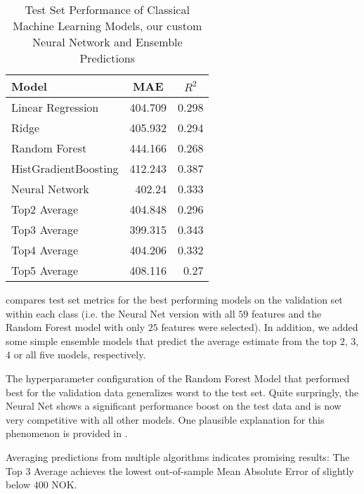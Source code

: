 \begin{table}[th]
  \centering
  \begin{tabular}{lrr}
    \hline
    Model                & \multicolumn{1}{c}{MAE} & \multicolumn{1}{c}{$R^2$} \\ \hline
    Linear Regression    & 404.709                 & 0.298                     \\
    Ridge                & 405.932                 & 0.294                     \\
    Random Forest        & 444.166                 & 0.268                     \\
    HistGradientBoosting & 412.243                 & 0.387                     \\
    Neural Network       & 402.24                  & 0.333                     \\
    Top2 Average         & 404.848                 & 0.296                     \\
    Top3 Average         & 399.315                 & 0.343                     \\
    Top4 Average         & 404.206                 & 0.332                     \\
    Top5 Average         & 408.116                 & 0.27                      \\ \hline
  \end{tabular}
  \caption{Test Set Performance of Classical Machine Learning Models, our custom Neural Network and Ensemble Predictions}
  \label{tab:test-set}
\end{table}

 compares test set metrics for the best performing models on the validation set within each class (i.e. the Neural Net version with all $59$ features and the Random Forest model with only $25$ features were selected).
In addition, we added some simple ensemble models that predict the average estimate from the top $2$, $3$, $4$ or all five models, respectively.

The hyperparameter configuration of the Random Forest Model that performed best for the validation data generalizes worst to the test set.
Quite surpringly, the Neural Net shows a significant performance boost on the test data and is now very competitive with all other models.
One plausible explanation for this phenomenon is provided in .

Averaging predictions from multiple algorithms indicates promising results:
The Top $3$ Average achieves the lowest out-of-sample Mean Absolute Error of slightly below $400$ NOK.




